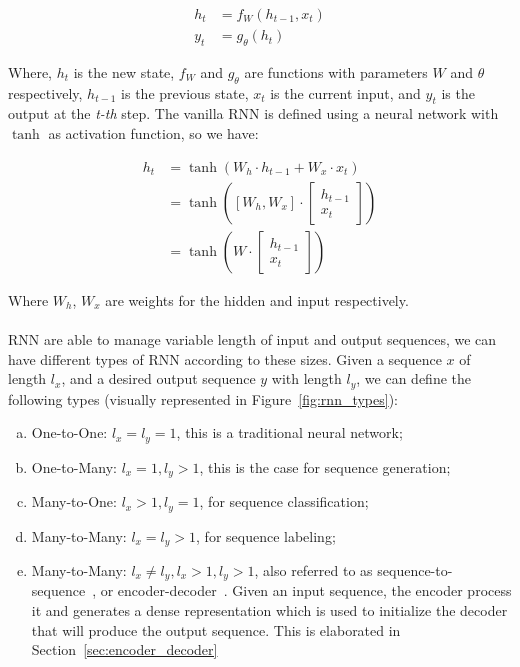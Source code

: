 \begin{equation}
\begin{split}
    h_t & = f_W(h_{t-1}, x_t) \\
    y_t & = g_{\theta}(h_t)
\end{split}
\label{eq:generic_rnn}
\end{equation}

Where, $h_t$ is the new state, $f_W$ and $g_\theta$ are functions with parameters $W$ and $\theta$ respectively, $h_{t-1}$ is the previous state, $x_t$ is the current input, and $y_t$ is the output at the \textit{t-th} step.
The vanilla RNN is defined using a neural network with $\tanh$ as activation function, so we have:

\begin{equation}
\begin{split}
    h_t & = \tanh\left(W_h \cdot h_{t-1} + W_x \cdot x_t\right)\\
        & = \tanh\left([W_h, W_x] \cdot \begin{bmatrix}
           h_{t-1} \\
           x_t
         \end{bmatrix}\right)\\
         & = \tanh\left(W \cdot \begin{bmatrix}
           h_{t-1} \\
           x_t
         \end{bmatrix}\right)
\end{split}
\end{equation}

Where $W_h$, $W_x$ are weights for the hidden and input respectively. 

\paragraph{}
RNN are able to manage variable length of input and output sequences, we can have different types of RNN according to these sizes. Given a sequence $x$ of length $l_x$, and a desired output sequence $y$ with length $l_y$, we can define the following types (visually represented in Figure~\ref{fig:rnn_types}):

\begin{enumerate}[a), noitemsep]
    \item One-to-One: $l_x = l_y = 1$, this is a traditional neural network;
    \item One-to-Many: $l_x = 1, l_y > 1$, this is the case for sequence generation;
    \item Many-to-One: $l_x > 1, l_y = 1$, for sequence classification;
    \item Many-to-Many: $l_x = l_y > 1$, for sequence labeling;
    \item Many-to-Many: $l_x \neq l_y, l_x > 1, l_y > 1$, also referred to as sequence-to-sequence~\citep{sutskever2014sequence}, or encoder-decoder~\citep{cho-etal-2014-learning}. Given an input sequence, the encoder process it and generates a dense representation which is used to initialize the decoder that will produce the output sequence. This is elaborated in Section~\ref{sec:encoder_decoder}
\end{enumerate}

